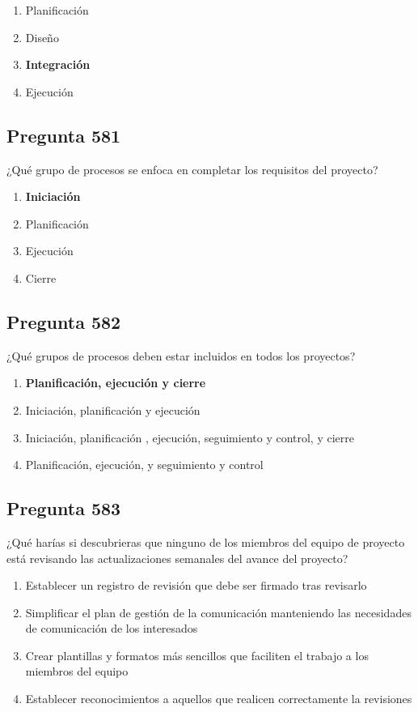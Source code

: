 \documentclass[11pt,a4paper]{article}
\begin{document}
\begin{enumerate}[label=\alph*)]
  \item Planificación
  \item Diseño
  \item \textbf{Integración}
  \item Ejecución
\end{enumerate}

\subsection*{Pregunta 581}
¿Qué grupo de procesos se enfoca en completar los requisitos del proyecto?

\begin{enumerate}[label=\alph*)]
  \item \textbf{Iniciación}
  \item Planificación
  \item Ejecución
  \item Cierre
\end{enumerate}

\subsection*{Pregunta 582}
¿Qué grupos de procesos deben estar incluidos en todos los proyectos?

\begin{enumerate}[label=\alph*)]
  \item \textbf{Planificación, ejecución y cierre}
  \item Iniciación, planificación y ejecución
  \item Iniciación, planificación , ejecución, seguimiento y control, y cierre
  \item Planificación, ejecución, y seguimiento y control
\end{enumerate}

\subsection*{Pregunta 583}
¿Qué harías si descubrieras que ninguno de los miembros del equipo de proyecto está revisando las actualizaciones semanales del avance del proyecto?

\begin{enumerate}[label=\alph*)]
  \item Establecer un registro de revisión que debe ser firmado tras revisarlo
  \item Simplificar el plan de gestión de la comunicación manteniendo las necesidades de comunicación de los interesados
  \item Crear plantillas y formatos más sencillos que faciliten el trabajo a los miembros del equipo
  \item Establecer reconocimientos a aquellos que realicen correctamente la revisiones
\end{enumerate}
\end{document}
